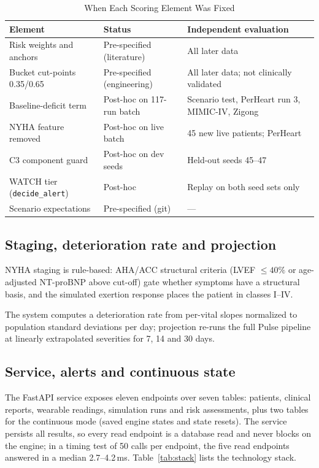 \documentclass[conference]{IEEEtran}
\newcommand{\code}[1]{\texttt{\footnotesize #1}}
\begin{document}
\begin{table}[!t]
\centering
\caption{When Each Scoring Element Was Fixed}
\label{tab:posthoc}
\footnotesize
\begin{tabularx}{\columnwidth}{@{}P{2.3cm}P{1.9cm}Y@{}}
\toprule
\textbf{Element} & \textbf{Status} & \textbf{Independent evaluation} \\
\midrule
Risk weights and anchors & Pre-specified (literature) & All later data \\
Bucket cut-points 0.35/0.65 & Pre-specified (engineering) & All later data; not clinically validated \\
Baseline-deficit term & Post-hoc on 117-run batch & Scenario test, PerHeart run 3, MIMIC-IV, Zigong \\
NYHA feature removed & Post-hoc on live batch & 45 new live patients; PerHeart \\
C3 component guard & Post-hoc on dev seeds & Held-out seeds 45--47 \\
WATCH tier (\code{decide\_alert}) & Post-hoc & Replay on both seed sets only \\
Scenario expectations & Pre-specified (git) & --- \\
\bottomrule
\end{tabularx}
\end{table}

\subsection{Staging, deterioration rate and projection}
NYHA staging is rule-based: AHA/ACC structural criteria (LVEF $\leq40\%$ or age-adjusted NT-proBNP above cut-off) \cite{heidenreich2022} gate whether symptoms have a structural basis, and the simulated exertion response places the patient in classes I--IV.

The system computes a deterioration rate from per-vital slopes normalized to population standard deviations per day; projection re-runs the full Pulse pipeline at linearly extrapolated severities for 7, 14 and 30 days.

\subsection{Service, alerts and continuous state}
The FastAPI service exposes eleven endpoints over seven tables: patients, clinical reports, wearable readings, simulation runs and risk assessments, plus two tables for the continuous mode (saved engine states and state resets). The service persists all results, so every read endpoint is a database read and never blocks on the engine; in a timing test of 50 calls per endpoint, the five read endpoints answered in a median 2.7--4.2\,ms. Table~\ref{tab:stack} lists the technology stack.
\end{document}
